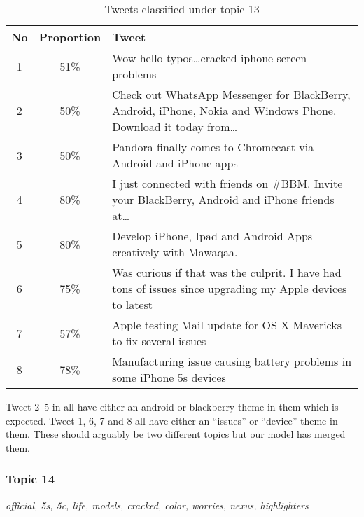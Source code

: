 \begin{table}[H]
  \begin{tabular}{c c p{13cm}} \toprule
    No & Proportion & Tweet \\ \midrule
    1  & 51\%       & Wow hello typos\ldots cracked iphone screen problems \\ \midrule
    2  & 50\%       & Check out WhatsApp Messenger for BlackBerry, Android, iPhone, Nokia and Windows Phone. Download it today from\ldots \\ \midrule
    3  & 50\%       & Pandora finally comes to Chromecast via Android and iPhone apps \\ \midrule
    4  & 80\%       & I just connected with friends on \#BBM\@. Invite your BlackBerry, Android and iPhone friends at\ldots \\ \midrule
    5  & 80\%       & Develop iPhone, Ipad and Android Apps creatively with Mawaqaa. \\ \midrule
    6  & 75\%       & Was curious if that was the culprit. I have had tons of issues since upgrading my Apple devices to latest \\ \midrule
    7  & 57\%       & Apple testing Mail update for OS X Mavericks to fix several issues \\ \midrule
    8  & 78\%       & Manufacturing issue causing battery problems in some iPhone 5s devices \\ \bottomrule
  \end{tabular}
  \caption{Tweets classified under topic 13}
  \label{tab:tweets_under_13}
\end{table}

Tweet 2--5 in  all have either an android or blackberry theme in them
which is expected. Tweet 1, 6, 7 and 8 all have either an ``issues'' or ``device'' theme in them.
These should arguably be two different topics but our model has merged them.


\subsubsection{Topic 14}
\label{sec:topic_14}
\textit{official, 5s, 5c, life, models, cracked, color, worries, nexus, highlighters}\\\\


